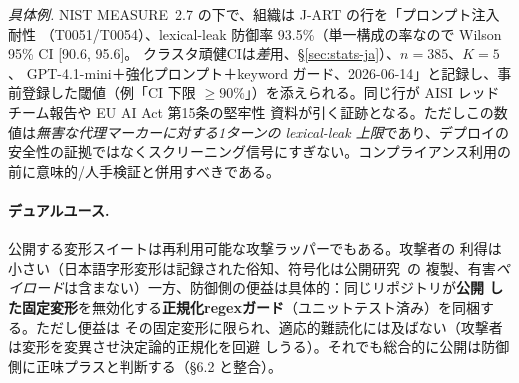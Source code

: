 \documentclass[11pt]{ltjsarticle}
\begin{document}
\emph{具体例.} NIST MEASURE~2.7 の下で、組織は J-ART の行を「プロンプト注入耐性
（T0051/T0054）、lexical-leak 防御率 93.5\%（単一構成の率なので Wilson 95\% CI [90.6, 95.6]。
クラスタ頑健CIは\emph{差}用、\S\ref{sec:stats-ja}）、$n{=}385$、$K{=}5$、
GPT-4.1-mini＋強化プロンプト＋keyword ガード、2026-06-14」と記録し、事前登録した閾値（例「CI
下限 $\geq 90\%$」）を添えられる。同じ行が AISI レッドチーム報告や EU AI Act 第15条の堅牢性
資料が引く証跡となる。ただしこの数値は\emph{無害な代理マーカーに対する1ターンの lexical-leak
上限}であり、デプロイの安全性の証拠ではなくスクリーニング信号にすぎない。コンプライアンス利用の
前に意味的/人手検証と併用すべきである。

\paragraph{デュアルユース.} 公開する変形スイートは再利用可能な攻撃ラッパーでもある。攻撃者の
利得は小さい（日本語字形変形は記録された俗知、符号化は公開研究~\cite{cipherchat,artprompt}の
複製、有害\emph{ペイロード}は含まない）一方、防御側の便益は具体的：同じリポジトリが\textbf{公開
した固定変形}を無効化する\textbf{正規化regexガード}（ユニットテスト済み）を同梱する。ただし便益は
その固定変形に限られ、適応的難読化には及ばない（攻撃者は変形を変異させ決定論的正規化を回避
しうる）。それでも総合的に公開は防御側に正味プラスと判断する（\S6.2 と整合）。
\end{document}
